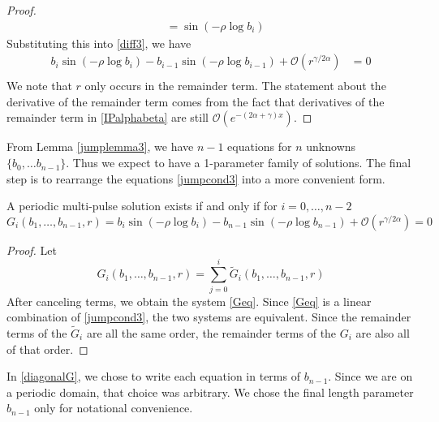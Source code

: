 \documentclass[thesis.tex]{subfiles}
\begin{document}
\begin{lemma}
\begin{proof}
\begin{align*}
&= \sin \left( -\rho \log b_i \right) 
\end{align*}
Substituting this into \eqref{diff3}, we have
\begin{align*}
b_i \sin \left( -\rho \log b_i \right) - b_{i-1} \sin \left( -\rho \log b_{i-1} \right) + \mathcal{O}(r^{\gamma / 2 \alpha}) &= 0 \\
\end{align*}
We note that $r$ only occurs in the remainder term. The statement about the derivative of the remainder term comes from the fact that derivatives of the remainder term in \eqref{IPalphabeta} are still $\mathcal{O}(e^{-(2 \alpha + \gamma) x})$.
\end{proof}
\end{lemma}

From Lemma \ref{jumplemma3}, we have $n-1$ equations for $n$ unknowns $\{ b_0, \dots b_{n-1} \}$. Thus we expect to have a 1-parameter family of solutions. The final step is to rearrange the equations \eqref{jumpcond3} into a more convenient form. 


\begin{lemma}\label{diagonalG}
A periodic multi-pulse solution exists if and only if for $i = 0, \dots, n-2$
\begin{equation}\label{Geq}
G_i(b_1, \dots, b_{n-1}, r) = b_i \sin \left( -\rho \log b_i \right) - b_{n-1} \sin \left( -\rho \log b_{n-1} \right) + \mathcal{O}(r^{\gamma / 2 \alpha}) = 0
\end{equation}

\begin{proof}
Let \begin{equation}\label{Gidef}
G_i(b_1, \dots, b_{n-1}, r) = \sum_{j = 0}^i \tilde{G}_i(b_1, \dots, b_{n-1}, r)
\end{equation}
After canceling terms, we obtain the system \eqref{Geq}. Since \eqref{Geq} is a linear combination of \eqref{jumpcond3}, the two systems are equivalent. Since the remainder terms of the $\tilde{G}_i$ are all the same order, the remainder terms of the $G_i$ are also all of that order.
\end{proof}
\end{lemma}

\begin{remark}
In \cref{diagonalG}, we chose to write each equation in terms of $b_{n-1}$. Since we are on a periodic domain, that choice was arbitrary. We chose the final length parameter $b_{n-1}$ only for notational convenience.
\end{remark}
\end{document}
